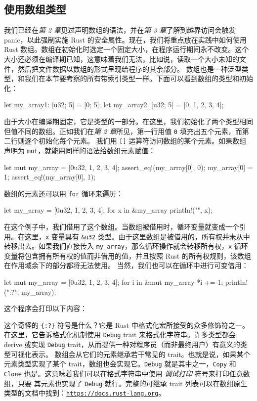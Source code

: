 \subsection{使用数组类型}
\label{idx:idx_06725fbb}
我们已经在\emph{第 2 章}见过声明数组的语法，并在\emph{第 3 章}了解到越界访问会触发 panic，以此强制实施 Rust 的安全属性。现在，我们将重点放在实践中如何使用 Rust 数组。数组在初始化时选定一个固定大小，在程序运行期间永不改变。这个大小还必须在编译期已知，这意味着我们无法，比如说，读取一个大小未知的文件，然后把文件数据以数组的形式呈现给程序的其余部分。
数组也是一种泛型类型，和我们在本节要考察的所有带索引类型一样。下面可以看到数组的类型和初始化：
\begin{codebox}[rust]
let my_array1: [u32; 5] = [0; 5];
let my_array2: [u32; 5] = [0, 1, 2, 3, 4];
\end{codebox}
由于大小在编译期固定，它是类型的一部分。在这里，我们初始化了两个类型相同但值不同的数组。正如我们在\emph{第 2 章}所见，第一行用值 \texttt{0} 填充出五个元素，而第二行则逐个初始化每个元素。
我们用 \texttt{[]} 运算符访问数组的某个元素。如果数组声明为 \texttt{mut}，就能用同样的语法给数组元素赋值：
\begin{codebox}[rust]
let mut my_array = [0u32, 1, 2, 3, 4];
assert_eq!(my_array[0], 0);
my_array[0] = 1;
assert_eq!(my_array[0], 1);
\end{codebox}
\label{idx:idx_fd254cf5}
数组的元素还可以用 \texttt{for} 循环来遍历：
\begin{codebox}[rust]
let my_array = [0u32, 1, 2, 3, 4];
for x in &my_array {
    println!("{}", x);
}
\end{codebox}
在这个例子中，我们借用了这个数组。当数组被借用时，循环变量就变成一个引用。在这里，\texttt{x} 变量具有 \texttt{\&u32} 类型。由于这里数组是被借用的，所有权并未从中转移出去。如果我们直接传入 \texttt{my\_array}，那么循环操作就会转移所有权，\texttt{x} 循环变量将包含拥有所有权的值而非借用的值，并且按照 Rust 的所有权规则，该数组在作用域余下的部分都将无法使用。
当然，我们也可以在循环中进行可变借用：
\begin{codebox}[rust]
let mut my_array = [0u32, 1, 2, 3, 4];
for i in &mut my_array {
    *i += 1;
}
println!("{:?}", my_array);
\end{codebox}
这个程序会打印以下内容：
\begin{codeboxdark}
[1, 2, 3, 4, 5]
\end{codeboxdark}
\label{idx:idx_e301216d}
这个奇怪的 \texttt{\{:?\}} 符号是什么？它是 Rust 中格式化宏所接受的众多修饰符之一。在这里，它告诉格式化机制使用 \texttt{Debug} trait 来格式化字符串。许多类型都会 derive 或实现 \texttt{Debug} trait，从而提供一种对程序员（而非最终用户）有意义的类型可视化表示。
数组会从它们的元素继承若干常见的 trait。也就是说，如果某个元素类型实现了某个 trait，数组也会实现它。\texttt{Debug} 就是其中之一，\texttt{Copy} 和
\texttt{Clone} 也是。这意味着我们可以在格式字符串中使用 \emph{调试打印} 符号来打印任意数组，只要
其元素也实现了 \texttt{Debug} 就行。完整的可继承 trait 列表可以在数组原生类型的文档中找到：\href{https://docs.rust-lang.org}{\texttt{https:/\allowbreak{}/\allowbreak{}docs.\allowbreak{}rust-\allowbreak{}lang.\allowbreak{}org}}。
